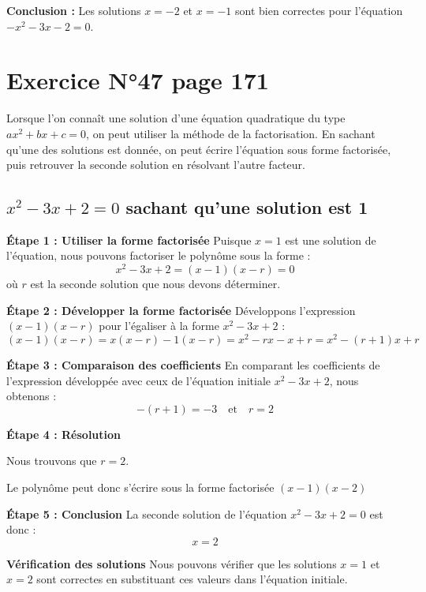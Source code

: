 \documentclass[a4paper,12pt]{article}
\begin{document}
\vspace{1em}

\textbf{Conclusion :} Les solutions \( x = -2 \) et \( x = -1 \) sont bien correctes pour l'équation \( -x^2 - 3x - 2 = 0 \).

\section*{Exercice N°47 page 171}

\begin{tcolorbox}[colback=yellow!10!white, colframe=yellow!50!black, title=Méthode pour trouver la seconde solution]
  Lorsque l'on connaît une solution d'une équation quadratique du type \( ax^2 + bx + c = 0 \), on peut utiliser la méthode de la factorisation. En sachant qu'une des solutions est donnée, on peut écrire l'équation sous forme factorisée, puis retrouver la seconde solution en résolvant l'autre facteur.
\end{tcolorbox}

\subsection*{\(x^2 - 3x + 2 = 0\) sachant qu'une solution est 1}

\textbf{Étape 1 : Utiliser la forme factorisée}
Puisque \( x = 1 \) est une solution de l'équation, nous pouvons factoriser le polynôme sous la forme :
\[
x^2 - 3x + 2 = (x - 1)(x - r) = 0
\]
où \( r \) est la seconde solution que nous devons déterminer.

\textbf{Étape 2 : Développer la forme factorisée}
Développons l'expression \( (x - 1)(x - r) \) pour l'égaliser à la forme \( x^2 - 3x + 2 \) :
\[
(x - 1)(x - r) = x(x - r) - 1(x - r) = x^2 - rx - x + r = x^2 - (r + 1)x + r
\]

\textbf{Étape 3 : Comparaison des coefficients}
En comparant les coefficients de l'expression développée avec ceux de l'équation initiale \( x^2 - 3x + 2 \), nous obtenons :
\[
-(r + 1) = -3 \quad \text{et} \quad r = 2
\]

\textbf{Étape 4 : Résolution}

Nous trouvons que \( r = 2 \).

Le polynôme peut donc s'écrire sous la forme factorisée \((x - 1)(x - 2)\)

\textbf{Étape 5 : Conclusion}
La seconde solution de l'équation \( x^2 - 3x + 2 = 0 \) est donc :
\[
x = 2
\]

\textbf{Vérification des solutions}
Nous pouvons vérifier que les solutions \( x = 1 \) et \( x = 2 \) sont correctes en substituant ces valeurs dans l'équation initiale.
\end{document}
